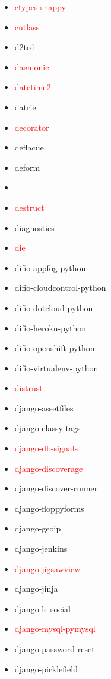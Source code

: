 \documentclass{l4proj}
\begin{document}
\begin{appendices}
{\begin{itemize}
\item\textcolor{red}{ctypes-snappy}
\item\textcolor{red}{cutlass}
\item d2to1
\item\textcolor{red}{daemonic}
\end{itemize}
}%
\noindent\parbox[t]{0.32\textwidth}{\raggedright%
\begin{itemize}
\item\textcolor{red}{datetime2}
\item datrie
\item\textcolor{red}{decorator}
\item deflacue
\item deform
\item {}
\item\textcolor{red}{destruct}
\item diagnostics
\item\textcolor{red}{die}
\item difio-appfog-python
\item difio-cloudcontrol-python
\item difio-dotcloud-python
\item difio-heroku-python
\item difio-openshift-python
\item difio-virtualenv-python
\item\textcolor{red}{distrust}
\item django-assetfiles
\item django-classy-tags
\item\textcolor{red}{django-db-signals}
\item\textcolor{red}{django-discoverage}
\item django-discover-runner
\item django-floppyforms
\item django-geoip
\item django-jenkins
\item\textcolor{red}{django-jigsawview}
\item django-jinja
\item django-le-social
\item\textcolor{red}{django-mysql-pymysql}
\item django-password-reset
\end{itemize}
}%
\noindent\parbox[t]{0.32\textwidth}{\raggedright%
\begin{itemize}
\item django-picklefield

\end{itemize}}
\end{appendices}
\end{document}
